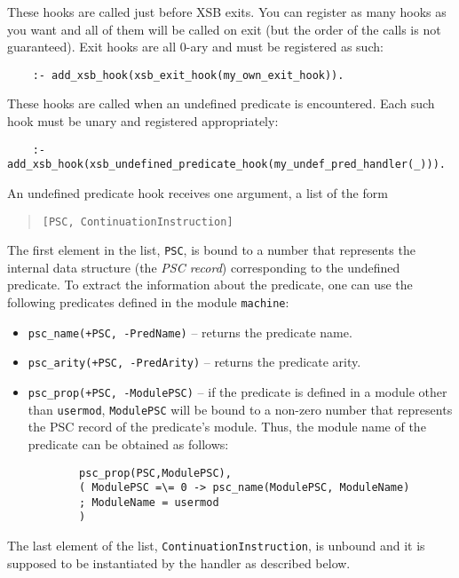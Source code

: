 \begin{description}
 

These hooks are called just before XSB exits. You can register as many
hooks as you want and all of them will be called on exit (but the order of
the calls is not guaranteed). Exit hooks are all 0-ary and must be registered
as such:
\begin{verbatim}
    :- add_xsb_hook(xsb_exit_hook(my_own_exit_hook)).
\end{verbatim}


These hooks are called when an undefined predicate is encountered.
Each such hook must be unary and registered appropriately:
\begin{verbatim}
    :- add_xsb_hook(xsb_undefined_predicate_hook(my_undef_pred_handler(_))).
\end{verbatim}
An undefined predicate hook receives one argument, a list of the form
\begin{quote}
  {\tt [PSC, ContinuationInstruction]} 
\end{quote}
The first element in the list, {\tt PSC}, is bound to a number that
represents the internal data structure (the \emph{PSC record})
corresponding to the undefined predicate. To extract the information about
the predicate, one can use the following predicates defined in the module
{\tt machine}:
\begin{itemize}
  \item  {\tt psc\_name(+PSC, -PredName)} -- returns the predicate name.
  \item  {\tt psc\_arity(+PSC, -PredArity)} -- returns the predicate arity.
  \item  {\tt psc\_prop(+PSC, -ModulePSC)} -- if the predicate is defined in
    a module other than {\tt usermod}, {\tt ModulePSC} will be bound to a
    non-zero number that represents the PSC record of the predicate's
    module. Thus, the module name of the predicate can be obtained as follows:
    \begin{verbatim}
        psc_prop(PSC,ModulePSC),
        ( ModulePSC =\= 0 -> psc_name(ModulePSC, ModuleName)
        ; ModuleName = usermod
        )
    \end{verbatim}
\end{itemize}
The last element of the list, {\tt ContinuationInstruction}, is unbound and
it is supposed to be instantiated by the handler as described below.


\end{description}
